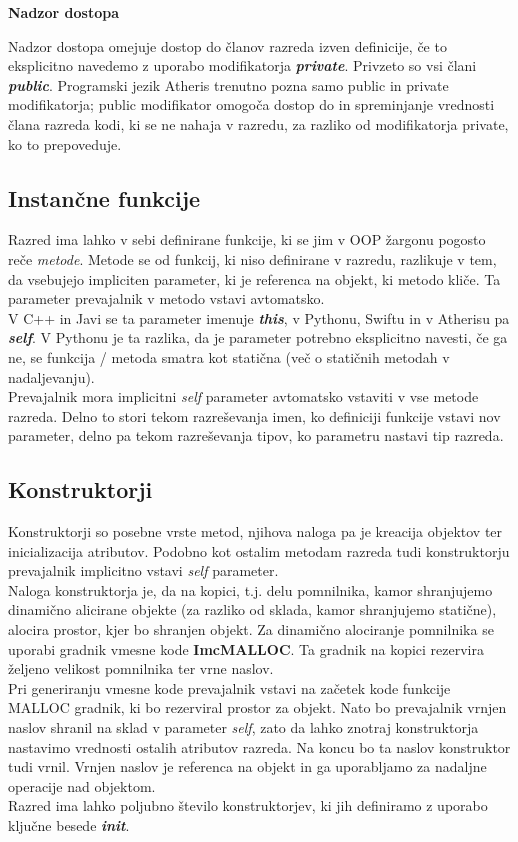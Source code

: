 \documentclass[a4paper, 12p]{book}
\begin{document}
\textbf{Nadzor dostopa}

Nadzor dostopa omejuje dostop do članov razreda izven definicije, če to eksplicitno navedemo z uporabo modifikatorja \textit{\textbf{private}}. Privzeto so vsi člani \textit{\textbf{public}}. Programski jezik Atheris trenutno pozna samo public in private modifikatorja; public modifikator omogoča dostop do in spreminjanje vrednosti člana razreda kodi, ki se ne nahaja v razredu, za razliko od modifikatorja private, ko to prepoveduje. 

\subsection{Instančne funkcije}

Razred ima lahko v sebi definirane funkcije, ki se jim v OOP žargonu pogosto reče \textit{metode}. Metode se od funkcij, ki niso definirane v razredu, razlikuje v tem, da vsebujejo impliciten parameter, ki je referenca na objekt, ki metodo kliče. Ta parameter prevajalnik v metodo vstavi avtomatsko. \\
\indent V C++ in Javi se ta parameter imenuje \textbf{\textit{this}}, v Pythonu, Swiftu in v Atherisu pa \textbf{\textit{self}}. V Pythonu je ta razlika, da je parameter potrebno eksplicitno navesti, če ga ne, se funkcija / metoda smatra kot statična (več o statičnih metodah v nadaljevanju). \\
\indent Prevajalnik mora implicitni \textit{self} parameter avtomatsko vstaviti v vse metode razreda. Delno to stori tekom razreševanja imen, ko definiciji funkcije vstavi nov parameter, delno pa tekom razreševanja tipov, ko parametru nastavi tip razreda. \\

\subsection{Konstruktorji}

Konstruktorji so posebne vrste metod, njihova naloga pa je kreacija objektov ter inicializacija atributov. Podobno kot ostalim metodam razreda tudi konstruktorju prevajalnik implicitno vstavi \textit{self} parameter. \\
\indent Naloga konstruktorja je, da na kopici, t.j. delu pomnilnika, kamor shranjujemo dinamično alicirane objekte (za razliko od sklada, kamor shranjujemo statične), alocira prostor, kjer bo shranjen objekt. Za dinamično alociranje pomnilnika se uporabi gradnik vmesne kode \textbf{ImcMALLOC}. Ta gradnik na kopici rezervira željeno velikost pomnilnika ter vrne naslov. \\
\indent Pri generiranju vmesne kode prevajalnik vstavi na začetek kode funkcije MALLOC gradnik, ki bo rezerviral prostor za objekt. Nato bo prevajalnik vrnjen naslov shranil na sklad v parameter \textit{self}, zato da lahko znotraj konstruktorja nastavimo vrednosti ostalih atributov razreda. Na koncu bo ta naslov konstruktor tudi vrnil. Vrnjen naslov je referenca na objekt in ga uporabljamo za nadaljne operacije nad objektom. \\
\indent Razred ima lahko poljubno število konstruktorjev, ki jih definiramo z uporabo ključne besede \textit{\textbf{init}}. 
\newpage
\end{document}
